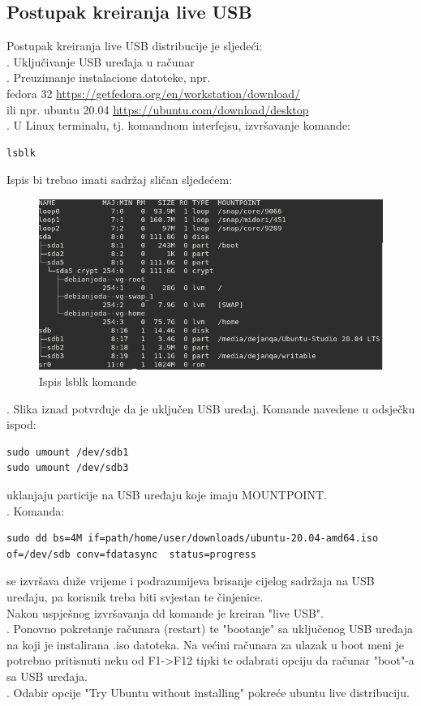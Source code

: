 \documentclass[12pt,vi]{mitthesis}
\begin{document}
\subsection*{Postupak kreiranja live USB}
\indent
Postupak kreiranja live USB distribucije je sljedeći:\\
. Uključivanje USB uređaja u računar\\
. Preuzimanje instalacione datoteke, npr.\\fedora 32 \url{https://getfedora.org/en/workstation/download/}\\
ili npr. ubuntu 20.04 \url{https://ubuntu.com/download/desktop}\\
. U Linux terminalu, tj. komandnom interfejsu, izvršavanje komande:
\begin{lstlisting}[style=BashInputStyle]
lsblk
\end{lstlisting}
\indent
Ispis bi trebao imati sadržaj sličan sljedećem:\\
\begin{figure}[!htb]
\centering
\includegraphics[width=\linewidth]{images/lsblkOutput.png}
\caption{Ispis lsblk komande}
\end{figure}
. Slika iznad potvrđuje da je uključen USB uređaj. Komande navedene u odsječku ispod:
\begin{lstlisting}[style=BashInputStyle]
sudo umount /dev/sdb1
sudo umount /dev/sdb3
\end{lstlisting}
uklanjaju particije na USB uređaju koje imaju MOUNTPOINT.\\
. Komanda:
\begin{lstlisting}[style=BashInputStyle]
sudo dd bs=4M if=path/home/user/downloads/ubuntu-20.04-amd64.iso of=/dev/sdb conv=fdatasync  status=progress
\end{lstlisting}
se izvršava duže vrijeme i podrazumijeva brisanje cijelog sadržaja na USB uređaju, pa korisnik treba biti svjestan te činjenice.\\
\indent
Nakon uspješnog izvršavanja dd komande je kreiran "live USB".\\
. Ponovno pokretanje računara (restart) te "bootanje" sa uključenog USB uređaja na koji je instalirana .iso datoteka. Na većini računara za ulazak u boot meni je potrebno pritisnuti neku od F1->F12 tipki te odabrati opciju da računar "boot"-a sa USB uređaja.\\
. Odabir opcije "Try Ubuntu without installing" pokreće ubuntu live distribuciju.
\end{document}
